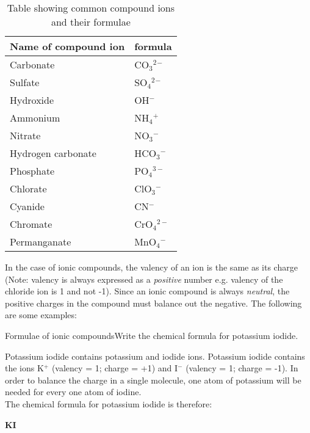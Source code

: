 \begin{table}[h]
\caption{Table showing common compound ions and their formulae}
\label{tab:ac:wcf:compound ion charges}
\begin{center}
\begin{tabular}{|l|l|}\hline
\textbf{Name of compound ion} & \textbf{formula}\\\hline
Carbonate & CO$_3$$^2$$^-$\\\hline
Sulfate & SO$_4$$^2$$^-$\\\hline
Hydroxide & OH$^-$\\\hline
Ammonium & NH$_{4}$$^{+}$\\\hline
Nitrate & NO$_{3}$$^{-}$\\\hline
Hydrogen carbonate & HCO$_3$$^-$\\\hline
Phosphate & PO$_{4}$$^{3-}$\\\hline
Chlorate & ClO$_{3}$$^{-}$\\\hline
Cyanide & CN$^{-}$\\\hline
Chromate & CrO$_{4}$$^{2-}$\\\hline
Permanganate & MnO$_{4}$$^{-}$\\\hline
\end{tabular}
\end{center}
\end{table}

In the case of ionic compounds, the valency of an ion is the same as its charge (Note: valency is always expressed as a 
\textit{positive} number e.g. valency of the chloride ion is 1 and not -1). Since an ionic compound is always \textit{neutral}, 
the positive charges in the compound must balance out the negative. The following are some examples:\\

\begin{wex}{Formulae of ionic compounds}{Write the chemical formula for potassium iodide.\\}

{
Potassium iodide contains potassium and iodide ions. 
Potassium iodide contains the ions K$^+$ (valency = 1; charge = +1) and I$^-$ (valency = 1; charge = -1). In order to balance the charge in a single molecule, one atom of potassium will be needed for every one atom of iodine.
\\

The chemical formula for potassium iodide is therefore: 

\begin{center}
\textbf{KI}
\end{center}}
\end{wex}


